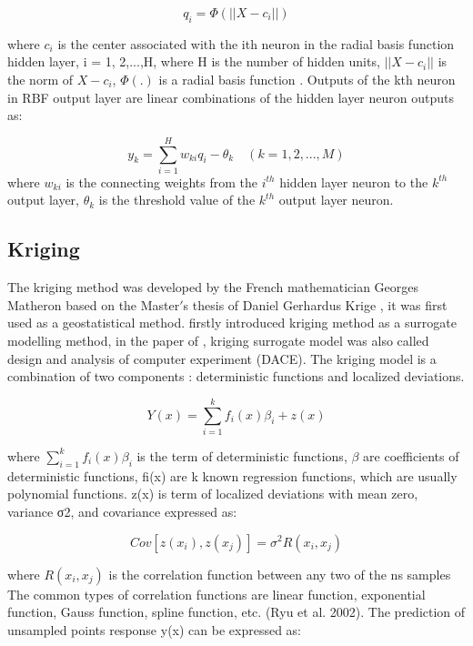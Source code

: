 \begin{equation}
q_{i} = \varPhi(|| X - c_{i} ||)
\end{equation}

where $ c_{i} $ is the center associated with the ith neuron in the radial basis function hidden layer, i = 1, 2,...,H, where H is the number of hidden units, $ || X - c_{i} || $ is the norm of $ X − c_{i} $, $ \varPhi (.) $ is a radial basis function \cite{chen1991orthogonal}. Outputs of the kth neuron in RBF output layer are linear combinations of the hidden layer neuron outputs as:

\begin{equation}
y_{k} = \sum_{i=1}^{H} w_{ki} q_{i} - \theta _{k} \quad (k = 1, 2,...,M)
\end{equation}
where $ w_{ki} $ is the connecting weights from the $ i^{th} $ hidden layer neuron to the $ k^{th} $ output layer, $ \theta _{k} $ is the threshold value of the $ k^{th} $ output layer neuron.

\subsection{Kriging}
The kriging method was developed by the French mathematician Georges Matheron based on the Master$ ' $s thesis of Daniel Gerhardus Krige \cite{matheron1963principles}, it was first used as a geostatistical method. \cite{sacks1989design} firstly introduced kriging method as a surrogate modelling method, in the paper of \cite{sacks1989design}, kriging surrogate model was also called design and analysis of computer experiment (DACE). The kriging model is a combination of two components \cite{queipo2005surrogate}: deterministic functions and localized deviations.

\begin{equation}
Y(x) = \sum_{i=1}^{k} f_{i} (x) \beta _{i} + z(x)
\end{equation}

where $ \sum_{i=1}^{k} f_{i} (x) \beta _{i} $ is the term of deterministic functions, $ \beta$ are coefficients of deterministic functions, fi(x) are k known regression functions, which are usually polynomial functions. z(x) is term of localized deviations with mean zero, variance σ2, and covariance expressed as:

\begin{equation}
Cov[z(x_{i}),z(x_{j})] = \sigma ^{2} R (x_{i},x_{j})
\end{equation}

where $ R (x_{i},x_{j}) $  is the correlation function between any two of the ns samples The common types of correlation functions are linear function, exponential function, Gauss function, spline function, etc. (Ryu et al. 2002). 
The prediction of unsampled points response y(x) can be expressed as:

